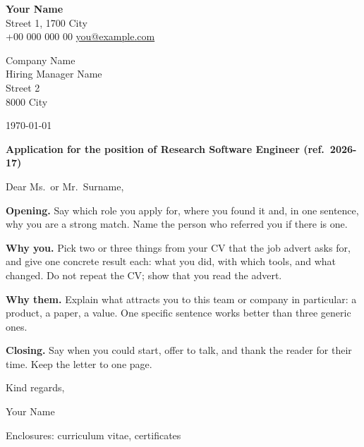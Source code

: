 \documentclass[11pt,a4paper]{article}
\begin{document}
\begin{flushright}
  {\Large\bfseries\color{accent} Your Name}\\[2pt]
  Street 1, 1700 City\\
  +00 000 000 00 \quad \href{mailto:you@example.com}{you@example.com}
\end{flushright}

\vspace{1cm}
Company Name\\
Hiring Manager Name\\
Street 2\\
8000 City

\hfill \today

\vspace{1cm}
\textbf{Application for the position of Research Software Engineer (ref.\ 2026-17)}

\vspace{0.5em}
Dear Ms.\ or Mr.\ Surname,

\textbf{Opening.} Say which role you apply for, where you found it and, in one sentence,
why you are a strong match. Name the person who referred you if there is one.

\textbf{Why you.} Pick two or three things from your CV that the job advert asks for, and
give one concrete result each: what you did, with which tools, and what changed. Do not
repeat the CV; show that you read the advert.

\textbf{Why them.} Explain what attracts you to this team or company in particular: a
product, a paper, a value. One specific sentence works better than three generic ones.

\textbf{Closing.} Say when you could start, offer to talk, and thank the reader for their
time. Keep the letter to one page.

Kind regards,

\vspace{1.2cm}
Your Name

\vfill
\small Enclosures: curriculum vitae, certificates
\end{document}
